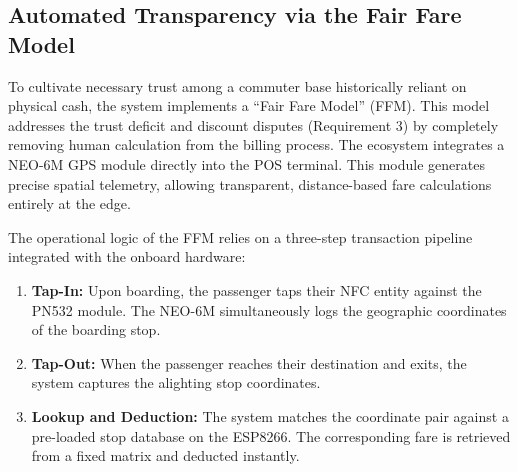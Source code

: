 \documentclass[manuscript,review,anonymous]{acmart}
\begin{document}
\begin{table}[t]
  \centering
  \caption{Machhapokhari to Ratnapark Route Fare Matrix (NPR) - Student Rate}
  \label{tab:fare_matrix}
\end{table}

\subsection{Automated Transparency via the Fair Fare Model}
To cultivate necessary trust among a commuter base historically reliant on physical cash, the system implements a ``Fair Fare Model'' (FFM). This model addresses the trust deficit and discount disputes (Requirement 3) by completely removing human calculation from the billing process. The ecosystem integrates a NEO-6M GPS module directly into the POS terminal. This module generates precise spatial telemetry, allowing transparent, distance-based fare calculations entirely at the edge.

The operational logic of the FFM relies on a three-step transaction pipeline integrated with the onboard hardware:
\begin{enumerate}
\item \textbf{Tap-In:} Upon boarding, the passenger taps their NFC entity against the PN532 module. The NEO-6M simultaneously logs the geographic coordinates of the boarding stop.
\item \textbf{Tap-Out:} When the passenger reaches their destination and exits, the system captures the alighting stop coordinates.
\item \textbf{Lookup and Deduction:} The system matches the coordinate pair against a pre-loaded stop database on the ESP8266. The corresponding fare is retrieved from a fixed matrix and deducted instantly.
\end{enumerate}
\end{document}
